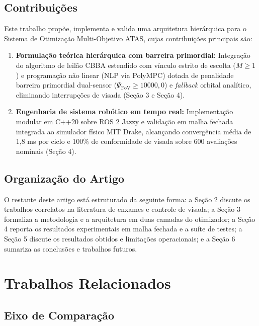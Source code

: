 \documentclass[
  brazilian,
  a4paper]{article}
\providecommand{\tightlist}{%
  \setlength{\itemsep}{0pt}\setlength{\parskip}{0pt}}
\begin{document}
\subsection{Contribuições}\label{contribuiuxe7uxf5es}

Este trabalho propõe, implementa e valida uma arquitetura hierárquica
para o Sistema de Otimização Multi-Objetivo ATAS, cujas contribuições
principais são:

\begin{enumerate}
\def\labelenumi{\arabic{enumi}.}
\tightlist
\item
  \textbf{Formulação teórica hierárquica com barreira primordial:}
  Integração do algoritmo de leilão CBBA estendido com vínculo estrito
  de escolta (\(M \ge 1\)) e programação não linear (NLP via PolyMPC)
  dotada de penalidade barreira primordial dual-sensor
  (\(\Psi_{\text{FoV}} \ge 10000{,}0\)) e \emph{fallback} orbital
  analítico, eliminando interrupções de visada (Seção 3 e Seção 4).
\item
  \textbf{Engenharia de sistema robótico em tempo real:} Implementação
  modular em C++20 sobre ROS 2 Jazzy e validação em malha fechada
  integrada ao simulador físico MIT Drake, alcançando convergência média
  de 1,8 ms por ciclo e 100\% de conformidade de visada sobre 600
  avaliações nominais (Seção 4).
\end{enumerate}

\subsection{Organização do Artigo}\label{organizauxe7uxe3o-do-artigo}

O restante deste artigo está estruturado da seguinte forma: a Seção 2
discute os trabalhos correlatos na literatura de enxames e controle de
visada; a Seção 3 formaliza a metodologia e a arquitetura em duas
camadas do otimizador; a Seção 4 reporta os resultados experimentais em
malha fechada e a suíte de testes; a Seção 5 discute os resultados
obtidos e limitações operacionais; e a Seção 6 sumariza as conclusões e
trabalhos futuros.

\section{Trabalhos Relacionados}\label{trabalhos-relacionados}

\subsection{Eixo de Comparação}\label{eixo-de-comparauxe7uxe3o}
\end{document}
